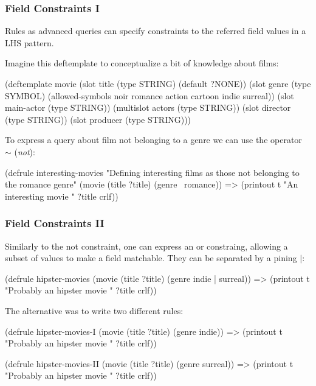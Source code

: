 \documentclass[xcolor={usenames,dvipsnames,svgnames}, compress]{beamer}
\begin{document}
\begin{frame}[fragile]
  \frametitle{Field Constraints I}
  Rules as advanced queries can specify constraints to the referred
  field values in a LHS pattern.\par
  Imagine this \textsf{deftemplate} to conceptualize a bit of
  knowledge about films:
  \begin{clips-code}[numbers=none]
    (deftemplate movie
        (slot title (type STRING) (default ?NONE))
        (slot genre (type SYMBOL)
            (allowed-symbols noir romance action cartoon indie surreal))
        (slot main-actor (type STRING))
        (multislot actors (type STRING))
        (slot director (type STRING))
        (slot producer (type STRING)))
  \end{clips-code}

  To express a query about film not belonging to a genre we can use
  the operator $\mathbf{\sim}$ (\emph{not}):
  \begin{clips-code}[numbers=none]
    (defrule interesting-movies
        "Defining interesting films as those not belonging to the romance genre"
        (movie (title ?title) (genre ~romance))
        =>
        (printout t "An interesting movie " ?title crlf))
  \end{clips-code}
\end{frame}

\begin{frame}[fragile]
  \frametitle{Field Constraints II}
  Similarly to the not constraint, one can express an or constraing,
  allowing a subset of values to make a field matchable. They can be separated by a pining $\mathbf{|}$:
  \begin{clips-code}[numbers=none]
    (defrule hipster-movies
        (movie (title ?title) (genre indie | surreal))
        =>
        (printout t "Probably an hipster movie " ?title crlf))    
  \end{clips-code}
  The alternative was to write two different rules:
  \begin{clips-code}[numbers=none]
    (defrule hipster-movies-I
        (movie (title ?title) (genre indie))
        =>
        (printout t "Probably an hipster movie " ?title crlf))

    (defrule hipster-movies-II
        (movie (title ?title) (genre surreal))
        =>
        (printout t "Probably an hipster movie " ?title crlf))
  \end{clips-code}
\end{frame}
\end{document}
